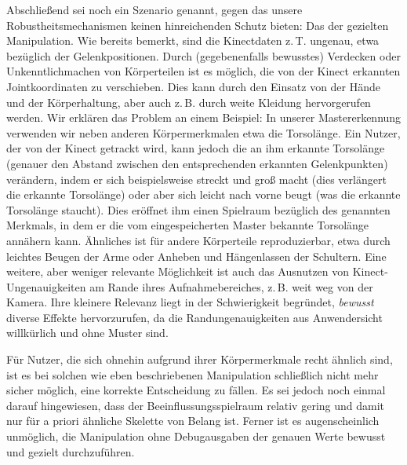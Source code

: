 	Abschließend sei noch ein Szenario genannt, gegen das unsere Robustheitsmechanismen keinen hinreichenden Schutz bieten: Das der gezielten Manipulation. Wie bereits bemerkt, sind die Kinectdaten z.\,T. ungenau, etwa bezüglich der Gelenkpositionen. Durch (gegebenenfalls bewusstes) Verdecken oder Unkenntlichmachen von Körperteilen ist es möglich, die von der Kinect erkannten Jointkoordinaten zu verschieben. Dies kann durch den Einsatz von der Hände und der Körperhaltung, aber auch z.\,B. durch weite Kleidung hervorgerufen werden. Wir erklären das Problem an einem Beispiel: In unserer Mastererkennung verwenden wir neben anderen Körpermerkmalen etwa die Torsolänge. Ein Nutzer, der von der Kinect getrackt wird, kann jedoch die an ihm erkannte Torsolänge (genauer den Abstand zwischen den entsprechenden erkannten Gelenkpunkten) verändern, indem er sich beispielsweise streckt und \glqq groß macht\grqq{} (dies verlängert die erkannte Torsolänge) oder aber sich leicht nach vorne beugt (was die erkannte Torsolänge staucht). Dies eröffnet ihm einen Spielraum bezüglich des genannten Merkmals, in dem er die vom eingespeicherten Master bekannte Torsolänge annähern kann. Ähnliches ist für andere Körperteile reproduzierbar, etwa durch leichtes Beugen der Arme oder Anheben und Hängenlassen der Schultern. Eine weitere, aber weniger relevante Möglichkeit ist auch das Ausnutzen von Kinect-Ungenauigkeiten am Rande ihres Aufnahmebereiches, z.\,B. weit weg von der Kamera. Ihre kleinere Relevanz liegt in der Schwierigkeit begründet, \emph{bewusst} diverse Effekte hervorzurufen, da die Randungenauigkeiten aus Anwendersicht willkürlich und ohne Muster sind.\par
	Für Nutzer, die sich ohnehin aufgrund ihrer Körpermerkmale recht ähnlich sind, ist es bei solchen wie eben beschriebenen Manipulation schließlich nicht mehr sicher möglich, eine korrekte Entscheidung zu fällen. Es sei jedoch noch einmal darauf hingewiesen, dass der Beeinflussungsspielraum relativ gering und damit nur für a priori ähnliche Skelette von Belang ist. Ferner ist es augenscheinlich unmöglich, die Manipulation ohne Debugausgaben der genauen Werte bewusst und gezielt durchzuführen.
